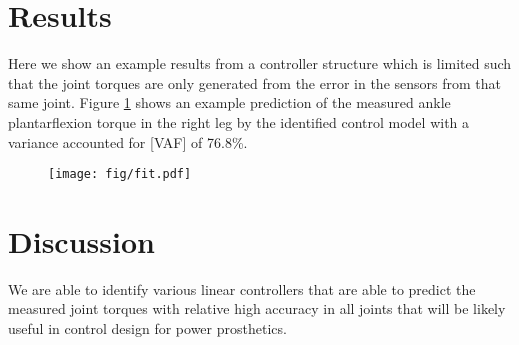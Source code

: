 \documentclass[10pt,letterpaper,notitlepage,twocolumn]{article}
\begin{document}
\section*{Results}
%
Here we show an example results from a controller structure which is limited
such that the joint torques are only generated from the error in the sensors
from that same joint. Figure \ref{fig:fit} shows an example prediction of the
measured ankle plantarflexion torque in the right leg by the identified control
model with a variance accounted for [VAF] of 76.8\%.
%
\begin{figure}
  \begin{center}
    \texttt{[image: fig/fit.pdf]}
    \label{fig:fit}
  \end{center}
\end{figure}
%
\section*{Discussion}
%
We are able to identify various linear controllers that are able to predict the
measured joint torques with relative high accuracy in all joints that will be
likely useful in control design for power prosthetics.
\end{document}
